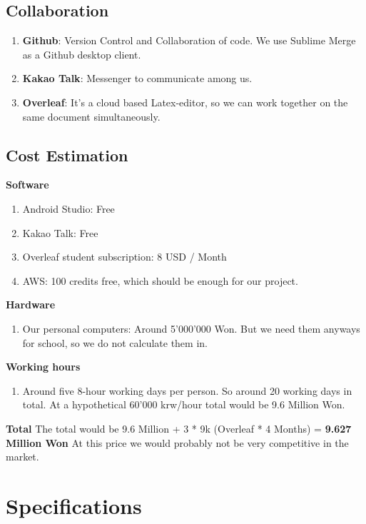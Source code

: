 \documentclass[conference]{IEEEtran}
\numberwithin{figure}{subsection}
\begin{document}
\subsection{Collaboration}
\begin{enumerate}
 \item \textbf{Github}: Version Control and Collaboration of code. We use Sublime Merge as a Github desktop client.
 \newline
 \item \textbf{Kakao Talk}: Messenger to communicate among us.
 \newline
 \item \textbf{Overleaf}: It's a cloud based Latex-editor, so we can work together on the same document simultaneously.
 \newline
 \end{enumerate}

\subsection{Cost Estimation}
\textbf{Software}
\begin{enumerate}
\item Android Studio: Free
\item Kakao Talk: Free
\item Overleaf student subscription: 8 USD / Month
\item AWS: 100 credits free, which should be enough for our project.
\end{enumerate}
\textbf{Hardware}
\begin{enumerate}
\item Our personal computers: Around 5'000'000 Won. But we need them anyways for school, so we do not calculate them in.
\end{enumerate}
\textbf{Working hours}
\begin{enumerate}
\item Around five 8-hour working days per person. So around 20 working days in total. At a hypothetical 60'000 krw/hour total would be  9.6 Million Won.
\end{enumerate}
\textbf{Total}
The total would be 9.6 Million + 3 * 9k (Overleaf * 4 Months) =\textbf{ 9.627 Million Won} At this price we would probably not be very competitive in the market.
\newline


\section{Specifications}
\end{document}
